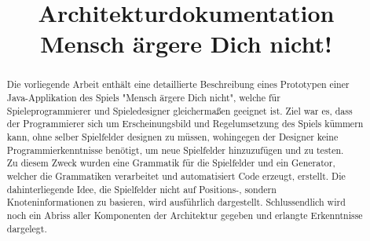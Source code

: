 \documentclass[conference]{IEEEtran}
\begin{document}
%
\title{Architekturdokumentation\\Mensch \"argere Dich nicht!}


\author{
\and
{}
}

\maketitle

\begin{abstract}
Die vorliegende Arbeit enth\"alt eine detaillierte Beschreibung eines Prototypen einer Java-Applikation des Spiels "Mensch \"argere Dich nicht",
welche f\"ur Spieleprogrammierer und Spieledesigner gleicherma\ss en geeignet ist. Ziel war es, dass der Programmierer
sich um Erscheinungsbild und Regelumsetzung des Spiels k\"ummern kann, ohne selber Spielfelder designen zu m\"ussen, wohingegen der Designer keine
Programmierkenntnisse ben\"otigt, um neue Spielfelder hinzuzuf\"ugen und zu testen.\\ Zu diesem Zweck wurden eine Grammatik f\"ur die Spielfelder
und ein Generator, welcher die Grammatiken verarbeitet und automatisiert Code erzeugt, erstellt. Die dahinterliegende Idee, die Spielfelder
nicht auf Positions-, sondern Knoteninformationen zu basieren, wird ausf\"uhrlich dargestellt. Schlussendlich wird noch ein Abriss aller Komponenten der Architektur gegeben und erlangte Erkenntnisse dargelegt.
\end{abstract}

\IEEEpeerreviewmaketitle
\end{document}
